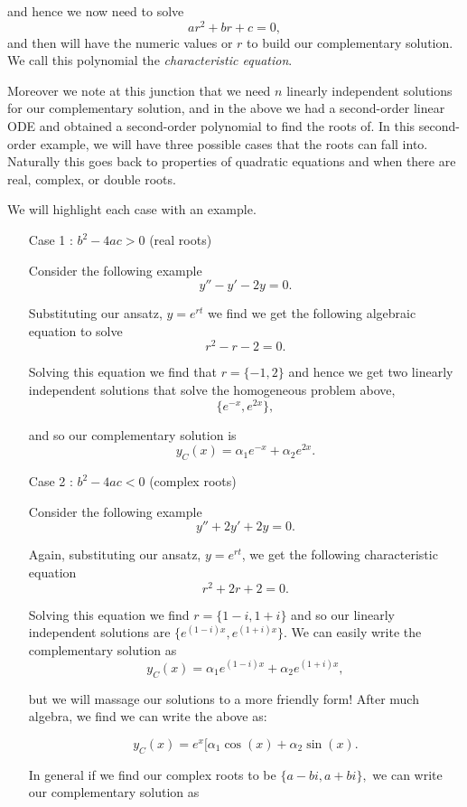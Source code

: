 and hence we now need to solve $$a r^2 + b r + c = 0,$$ and then will have the numeric values or $r$ to build our complementary solution. We call this polynomial the \emph{characteristic equation}. 

Moreover we note at this junction that we need $n$ linearly independent solutions for our complementary solution, and in the above we had a second-order linear ODE and obtained a second-order polynomial to find the roots of. In this second-order example, we will have three possible cases that the roots can fall into. Naturally this goes back to properties of quadratic equations and when there are real, complex, or double roots. 

We will highlight each case with an example. 

\begin{itemize}

%
%
\item[Case 1]: $b^2 - 4ac > 0$ (real roots)

Consider the following example $$y'' -  y' - 2y = 0.$$

Substituting our ansatz, $y= e^{rt}$ we find we get the following algebraic equation to solve $$r^2 - r - 2=0.$$

Solving this equation we find that $r = \{ -1,2\}$ and hence we get two linearly independent solutions that solve the homogeneous problem above, $$\{ e^{-x}, e^{2x}\},$$

and so our complementary solution is $$y_C(x) = \alpha_1 e^{-x} + \alpha_2 e^{2x}.$$

%
%
\item[Case 2]: $b^2 - 4ac < 0$ (complex roots)

Consider the following example $$y''+2y' + 2y = 0.$$

Again, substituting our ansatz, $y=e^{rt}$, we get the following characteristic equation $$r^2+2r+2=0.$$

Solving this equation we find $r = \{ 1-i,1+i\}$ and so our linearly independent solutions are $\{ e^{(1-i)x}, e^{(1+i)x}\}$. We can easily write the complementary solution as $$y_C(x) = \alpha_1 e^{(1-i)x} + \alpha_2 e^{(1+i)x},$$

but we will massage our solutions to a more friendly form! After much algebra, we find we can write the above as:

$$y_C(x) = e^{x} \Big[ \alpha_1 \cos(x) + \alpha_2 \sin(x) \Big.$$

In general if we find our complex roots to be $\{ a-bi, a+bi \},$ we can write our complementary solution as


\end{itemize}
